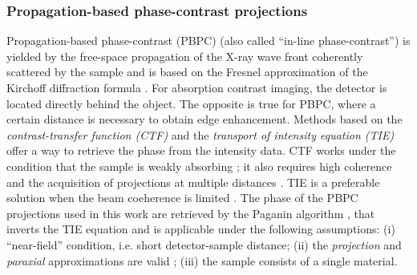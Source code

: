 {\subsubsection{Propagation-based phase-contrast projections}
\label{introduction:phase-contrast-imaging:propagation-based-phase-contrast-projections}
Propagation-based phase-contrast (PBPC) (also called ``in-line phase-contrast'') is yielded by the free-space propagation
of the X-ray wave front coherently scattered by the sample \cite{Snigirev1995,Wilkins1996} and is based on the Fresnel approximation of the Kirchoff diffraction formula
\cite{Goodman2005}. For absorption contrast imaging,
the detector is located directly behind the object.
The opposite is true for PBPC, where a certain distance is necessary to obtain edge enhancement.
\newline
 Methods based on the \emph{contrast-transfer function (CTF)} \cite{Guigay1977} and the \emph{transport of intensity equation (TIE)} 
 \cite{Teague1983,Rytov2011} offer a way to retrieve the phase from the intensity data. CTF works under the condition that the sample is 
 weakly absorbing \cite{Langer2008}; it also requires high coherence and the acquisition of 
 projections at multiple distances \cite{Cloetens1999}. TIE is a preferable
 solution when the beam coeherence is limited \cite{Paganin2002}. 
\newline 
The phase of the PBPC projections used in this work are retrieved by the Paganin algorithm \cite{Paganin2002},
that inverts the TIE equation and is applicable under the following assumptions: (i) ``near-field'' condition, i.e. short detector-sample distance;
 (ii) the \emph{projection} and \emph{paraxial} approximations are valid \cite{Paganin2006}; (iii) the sample consists of a single material.
}
